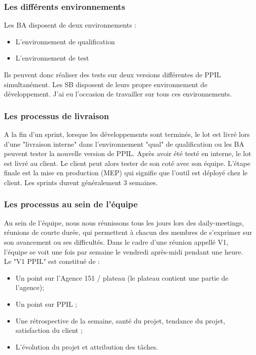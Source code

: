 \subsubsection{Les différents environnements}
Les BA disposent de deux environnements :
\begin{itemize}
    \item L'environnement de qualification
    \item L'environnement de test
\end{itemize}
Ils peuvent donc réaliser des tests sur deux versions différentes de PPIL simultanément. Les SB disposent de leurs propre environnement de développement. J'ai eu l'occasion de travailler sur tous ces environnements.
\subsubsection{Les processus de livraison}
A la fin d'un sprint, lorsque les développements sont terminés, le lot est livré lors d'une "livraison interne" dans l'environnement "qual" de qualification ou les BA peuvent tester la nouvelle version de PPIL. Après avoir été testé en interne, le lot est livré au client. Le client peut alors tester de son coté avec son équipe. L'étape finale est la mise en production (MEP) qui signifie que l'outil est  déployé chez le client. Les sprints durent généralement 3 semaines.
\subsubsection{Les processus au sein de l'équipe}
Au sein de l'équipe, nous nous réunissons tous les jours lors des daily-meetings, réunions de courte durée, qui permettent à chacun des membres de s'exprimer sur son avancement ou ses difficultés. Dans le cadre d'une réunion appellé V1, l'équipe se voit une fois par semaine le vendredi après-midi pendant une heure. 
Le "V1 PPIL" est constitué de :
\begin{itemize}
    \item Un point sur l'Agence 151 / plateau (le plateau contient une partie de l'agence);
    \item Un point sur PPIL ; 
    \item Une rétrospective de la semaine, santé du projet, tendance du projet, satisfaction du client ;
    \item L'évolution du projet et attribution des tâches.
\end{itemize}
